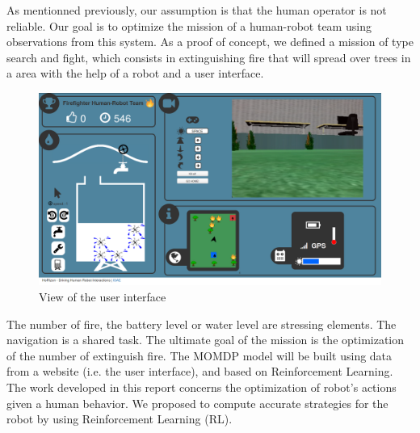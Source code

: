 \documentclass[conference]{IEEEtran}
\begin{document}
As mentionned previously, our assumption is that the human operator is not reliable.
Our goal is to optimize the mission of a human-robot team using observations from this system.
As a proof of concept, we defined a mission of type search and fight, which consists in extinguishing fire that will spread over trees in a area with the help of a robot and a user interface.

\begin{figure}
  \includegraphics[scale = 0.13	]{images/Website.png}
  \caption{View of the user interface}
  \label{fig:my-figure}
\end{figure}

The number of fire, the battery level or water level are stressing elements. The navigation is a shared task. The ultimate goal of the mission is the optimization of the number of extinguish fire.
The MOMDP model will be built using data from a website (i.e. the user interface), and based on Reinforcement Learning.
The work developed in this report concerns the optimization of robot's actions given a human behavior.
We proposed to compute accurate strategies for the robot by using Reinforcement Learning (RL).

\end{document}
